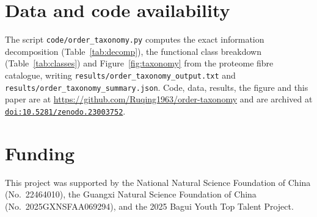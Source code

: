 \documentclass[11pt]{article}
\newcommand{\doi}[1]{\href{https://doi.org/#1}{\nolinkurl{doi:#1}}}
\theoremstyle{plain}
\theoremstyle{definition}
\theoremstyle{remark}
\begin{document}
\section*{Data and code availability}
The script \texttt{code/order\_taxonomy.py} computes the exact information decomposition (Table~\ref{tab:decomp}),
the functional class breakdown (Table~\ref{tab:classes}) and Figure~\ref{fig:taxonomy} from the proteome fibre
catalogue, writing \texttt{results/order\_taxonomy\_output.txt} and
\texttt{results/order\_taxonomy\_summary.json}. Code, data, results, the figure and this paper are at
\url{https://github.com/Ruqing1963/order-taxonomy} and are archived at \doi{10.5281/zenodo.23003752}.

\section*{Funding}
This project was supported by the National Natural Science Foundation of China (No.~22464010), the
Guangxi Natural Science Foundation of China (No.~2025GXNSFAA069294), and the 2025 Bagui Youth Top
Talent Project.
\end{document}
